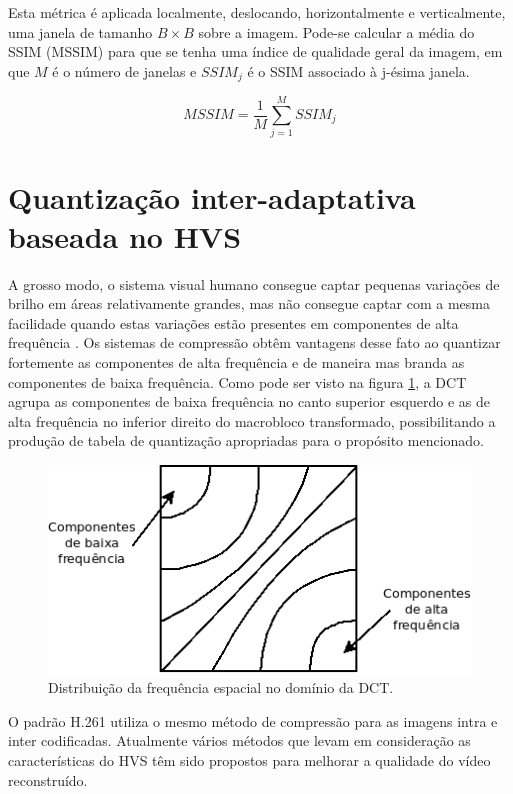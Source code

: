 Esta métrica é aplicada localmente, deslocando, horizontalmente e verticalmente, uma janela de tamanho $B \times B$ sobre a imagem. Pode-se calcular a média do SSIM (MSSIM) para que se tenha uma índice de qualidade geral da imagem, em que $ M $ é o número de janelas e $SSIM_{j}$ é o SSIM associado à j-ésima janela.

\begin{equation}
MSSIM = \frac{1}{M}\sum_{j = 1}^{M}SSIM_{j}
\end{equation}

\section{Quantização inter-adaptativa baseada no HVS}
\label{QIBSVH}

A grosso modo, o sistema visual humano consegue captar pequenas variações de brilho em áreas relativamente grandes, mas não consegue captar com a mesma facilidade quando estas variações estão presentes em componentes de alta frequência \cite{Kelly1979}. Os sistemas de compressão obtêm vantagens desse fato ao quantizar fortemente as componentes de alta frequência e de maneira mas branda as componentes de baixa frequência. Como pode ser visto na figura \ref{fig:dct_comp_distr}, a DCT agrupa as componentes de baixa frequência no canto superior esquerdo e as de alta frequência no inferior direito do macrobloco transformado, possibilitando a produção de tabela de quantização apropriadas para o propósito mencionado.

\begin{figure}[!ht]
\begin{center}
\includegraphics[scale=0.4]{./Figures/png/DCT_COMP.png}
\caption{Distribuição da frequência espacial no domínio da DCT.}
\label{fig:dct_comp_distr}
\end{center}
\end{figure}

O padrão H.261 \cite{telecommunication1993itu} utiliza o mesmo método de compressão para as imagens intra e inter codificadas. Atualmente vários métodos que levam em consideração as características do HVS têm sido propostos para melhorar a qualidade do vídeo reconstruído. 

